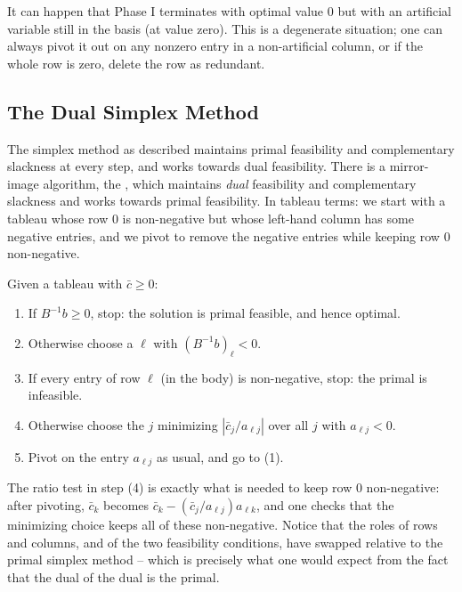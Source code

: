 \documentclass[a4paper]{scrartcl}
\begin{document}
\begin{remark}
    It can happen that Phase I terminates with optimal value $0$ but with an artificial variable still in the basis (at value zero). This is a degenerate situation; one can always pivot it out on any nonzero entry in a non-artificial column, or if the whole row is zero, delete the row as redundant.
\end{remark}

\subsection{The Dual Simplex Method}

The simplex method as described maintains primal feasibility and complementary slackness at every step, and works towards dual feasibility. There is a mirror-image algorithm, the , which maintains \emph{dual} feasibility and complementary slackness and works towards primal feasibility. In tableau terms: we start with a tableau whose row $0$ is non-negative but whose left-hand column has some negative entries, and we pivot to remove the negative entries while keeping row $0$ non-negative.

\begin{definition}
    Given a tableau with $\bar c \geq 0$:
    \begin{enumerate}[label=(\arabic*)]
        \item If $B^{-1}b \geq 0$, stop: the solution is primal feasible, and hence optimal.
        \item Otherwise choose a  $\ell$ with $(B^{-1}b)_\ell < 0$.
        \item If every entry of row $\ell$ (in the body) is non-negative, stop: the primal is infeasible.
        \item Otherwise choose the  $j$ minimizing $\left|\bar c_j / a_{\ell j}\right|$ over all $j$ with $a_{\ell j} < 0$.
        \item Pivot on the entry $a_{\ell j}$ as usual, and go to (1).
    \end{enumerate}
\end{definition}

The ratio test in step (4) is exactly what is needed to keep row $0$ non-negative: after pivoting, $\bar c_k$ becomes $\bar c_k - (\bar c_j / a_{\ell j})a_{\ell k}$, and one checks that the minimizing choice keeps all of these non-negative. Notice that the roles of rows and columns, and of the two feasibility conditions, have swapped relative to the primal simplex method -- which is precisely what one would expect from the fact that the dual of the dual is the primal.
\end{document}
